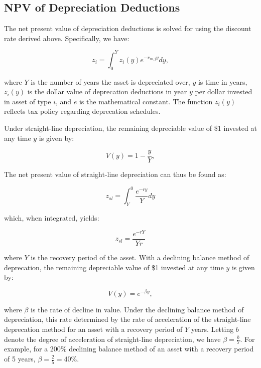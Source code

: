 \documentclass[article,11pt,letterpaper,fleqn]{article}
\theoremstyle{definition}
\numberwithin{equation}{section}
\begin{document}
\subsection{NPV of Depreciation Deductions}

The net present value of depreciation deductions is solved for using the discount rate derived above.  Specifically, we have: 

\begin{equation}
z_{i} = \int_{0}^{Y}z_{i}(y)e^{-r_{m,j}y}dy,
\end{equation}

\noindent\noindent where $Y$ is the number of years the asset is depreciated over, $y$ is time in years, $z_{i}(y)$ is the dollar value of deprecation deductions in year $y$ per dollar invested in asset of type $i$, and $e$ is the mathematical constant.  The function $z_{i}(y)$ reflects tax policy regarding deprecation schedules.  

Under straight-line depreciation, the remaining depreciable value of \$1 invested at any time $y$ is given by: 

\begin{equation}
V(y) =  1-\frac{y}{Y}, 
\end{equation}

The net present value of straight-line depreciation can thus be found as: 

\begin{equation}
z_{sl}=\int_{Y}^{0}\frac{e^{-ry}}{Y}dy
\end{equation}

\noindent\noindent which, when integrated, yields:

\begin{equation}
z_{sl}=\frac{e^{-rY}}{Yr}
\end{equation}

\noindent\noindent where $Y$ is the recovery period of the asset.  With a declining balance method of deprecation, the remaining depreciable value of \$1 invested at any time $y$ is given by:

\begin{equation}
V(y) =  e^{-\beta y}, 
\end{equation}

\noindent\noindent where $\beta$ is the rate of decline in value.  Under the declining balance method of depreciation, this rate determined by the rate of acceleration of the straight-line deprecation method for an asset with a recovery period of $Y$ years.  Letting $b$ denote the degree of acceleration of straight-line depreciation, we have $\beta=\frac{b}{Y}$.  For example, for a 200\% declining balance method of an asset with a recovery period of 5 years, $\beta =\frac{2}{5}=40\%$.
\end{document}
